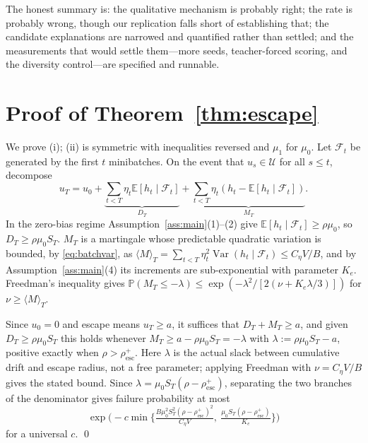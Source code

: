 \documentclass{article}
\theoremstyle{plain}
\theoremstyle{definition}
\theoremstyle{remark}
\newcommand{\E}{\mathbb{E}}
\newcommand{\Prob}{\mathbb{P}}
\newcommand{\Var}{\operatorname{Var}}
\newcommand{\1}{\mathbf{1}}
\newcommand{\cU}{\mathcal{U}}
\newcommand{\cF}{\mathcal{F}}
\begin{document}
The honest summary is: the qualitative mechanism is probably right; the rate is
probably wrong, though our replication falls short of establishing that; the
candidate explanations are narrowed and quantified rather than settled; and the
measurements that would settle them---more seeds, teacher-forced scoring, and the
diversity control---are specified and runnable.




\appendix

\section{Proof of Theorem~\ref{thm:escape}}
\label{app:escape}

We prove (i); (ii) is symmetric with inequalities reversed and $\mu_1$ for
$\mu_0$. Let $\cF_t$ be generated by the first $t$ minibatches. On the event that
$u_s\in\cU$ for all $s\le t$, decompose
\[
u_T = u_0 + \underbrace{\sum_{t<T}\eta_t\E[h_t\mid\cF_t]}_{D_T}
+ \underbrace{\sum_{t<T}\eta_t(h_t-\E[h_t\mid\cF_t])}_{M_T}.
\]
In the zero-bias regime Assumption~\ref{ass:main}(1)--(2) give
$\E[h_t\mid\cF_t]\ge\rho\mu_0$, so $D_T\ge\rho\mu_0S_T$. $M_T$ is a martingale
whose predictable quadratic variation is bounded, by \eqref{eq:batchvar}, as
$\langle M\rangle_T = \sum_{t<T}\eta_t^2\Var(h_t\mid\cF_t)\le C_\eta V/B$, and by
Assumption~\ref{ass:main}(4) its increments are sub-exponential with parameter
$K_e$. Freedman's inequality gives
$\Prob(M_T\le-\lambda)\le\exp(-\lambda^2/[2(\nu+K_e\lambda/3)])$ for
$\nu\ge\langle M\rangle_T$.

Since $u_0 = 0$ and escape means $u_T\ge a$, it suffices that $D_T+M_T\ge a$, and
given $D_T\ge\rho\mu_0S_T$ this holds whenever
$M_T\ge a-\rho\mu_0S_T = -\lambda$ with $\lambda := \rho\mu_0S_T-a$, positive
exactly when $\rho>\rho^{+}_{\mathrm{esc}}$. Here $\lambda$ is the actual slack
between cumulative drift and escape radius, not a free parameter; applying
Freedman with $\nu = C_\eta V/B$ gives the stated bound. Since
$\lambda = \mu_0S_T(\rho-\rho^{+}_{\mathrm{esc}})$, separating the two branches
of the denominator gives failure probability at most
\[
\exp\Big(-c\min\Big\{\tfrac{B\mu_0^2S_T^2(\rho-\rho^{+}_{\mathrm{esc}})^2}{C_\eta V},\
\tfrac{\mu_0S_T(\rho-\rho^{+}_{\mathrm{esc}})}{K_e}\Big\}\Big)
\]
for a universal $c$. \qed
\end{document}
